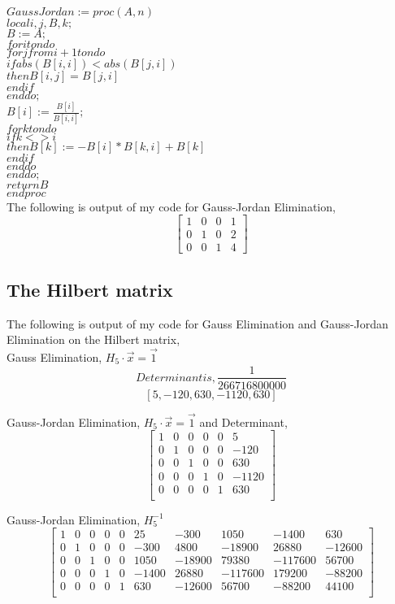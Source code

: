 \documentclass[12pt]{article}
\begin{document}
$GaussJordan := proc (A, n)$\\
$local i, j, B, k;$\\
$B := A;$\\
$for i to n do$\\
$for j from i+1 to n do$\\
$if abs(B[i, i]) < abs(B[j, i])$\\
$then B[i, j] = B[j, i]$\\
$end if$\\
$end do;$\\
$B[i] := \frac{B[i]}{B[i, i]};$\\
$for k to n do$\\
$if k <> i$\\
$then B[k] := -B[i]*B[k, i]+B[k]$\\
$end if$\\
$end do$\\
$end do;$\\
$return B$\\
$end proc$\\

The following is output of my code for Gauss-Jordan Elimination,
$$\begin{bmatrix}
1 & 0 & 0 & 1\\
0 & 1 & 0 & 2\\
0 & 0 & 1 & 4
\end{bmatrix}$$
\clearpage
\subsection{The Hilbert matrix}
The following is output of my code for Gauss  Elimination and Gauss-Jordan Elimination on the Hilbert matrix,\\

Gauss Elimination, $H_5 \cdot \vec{x} = \vec{1}$
$$Determinant is, \frac{1}{266716800000}$$
$$[5, -120, 630, -1120, 630]$$

Gauss-Jordan Elimination, $H_5 \cdot \vec{x} = \vec{1}$ and Determinant,
$$\begin{bmatrix}
1 & 0 & 0 & 0 & 0 & 5\\
0 & 1 & 0 & 0 & 0 & -120\\
0 & 0 & 1 & 0 & 0 & 630\\
0 & 0 & 0 & 1 & 0 & -1120\\
0 & 0 & 0 & 0 & 1 & 630\\
\end{bmatrix}$$

Gauss-Jordan Elimination, $H_5^{-1}$
$$\begin{bmatrix}
1 & 0 & 0 & 0 & 0 & 25 & -300 & 1050 & -1400 & 630\\
0 & 1 & 0 & 0 & 0 & -300 & 4800 & -18900 & 26880 & -12600\\
0 & 0 & 1 & 0 & 0 & 1050 & -18900 & 79380 & -117600 & 56700\\
0 & 0 & 0 & 1 & 0 & -1400 & 26880 & -117600 & 179200 & -88200\\
0 & 0 & 0 & 0 & 1 & 630 & -12600 & 56700 & -88200 & 44100\\
\end{bmatrix}$$
\end{document}
